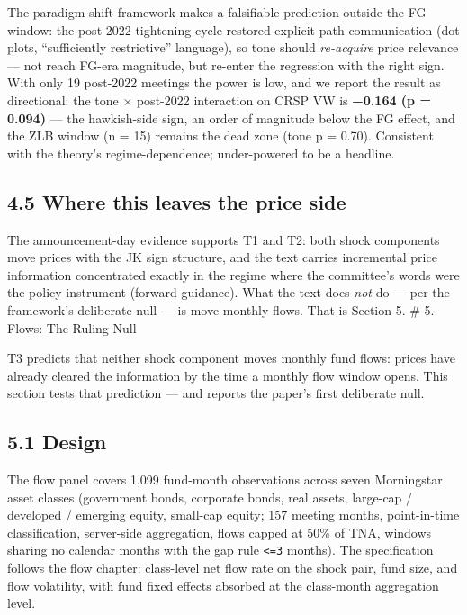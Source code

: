 The paradigm-shift framework makes a falsifiable prediction outside the FG window: the post-2022 tightening cycle restored explicit path communication (dot plots, ``sufficiently restrictive'' language), so tone should \emph{re-acquire} price relevance --- not reach FG-era magnitude, but re-enter the regression with the right sign. With only 19 post-2022 meetings the power is low, and we report the result as directional: the tone × post-2022 interaction on CRSP VW is \textbf{−0.164 (p = 0.094)} --- the hawkish-side sign, an order of magnitude below the FG effect, and the ZLB window (n = 15) remains the dead zone (tone p = 0.70). Consistent with the theory's regime-dependence; under-powered to be a headline.

\subsection{4.5 Where this leaves the price side}\label{where-this-leaves-the-price-side}

The announcement-day evidence supports T1 and T2: both shock components move prices with the JK sign structure, and the text carries incremental price information concentrated exactly in the regime where the committee's words were the policy instrument (forward guidance). What the text does \emph{not} do --- per the framework's deliberate null --- is move monthly flows. That is Section 5. \# 5. Flows: The Ruling Null

T3 predicts that neither shock component moves monthly fund flows: prices have already cleared the information by the time a monthly flow window opens. This section tests that prediction --- and reports the paper's first deliberate null.

\subsection{5.1 Design}\label{design}

The flow panel covers 1,099 fund-month observations across seven Morningstar asset classes (government bonds, corporate bonds, real assets, large-cap / developed / emerging equity, small-cap equity; 157 meeting months, point-in-time classification, server-side aggregation, flows capped at 50\% of TNA, windows sharing no calendar months with the gap rule \texttt{\textless{}=3} months). The specification follows the flow chapter: class-level net flow rate on the shock pair, fund size, and flow volatility, with fund fixed effects absorbed at the class-month aggregation level.

